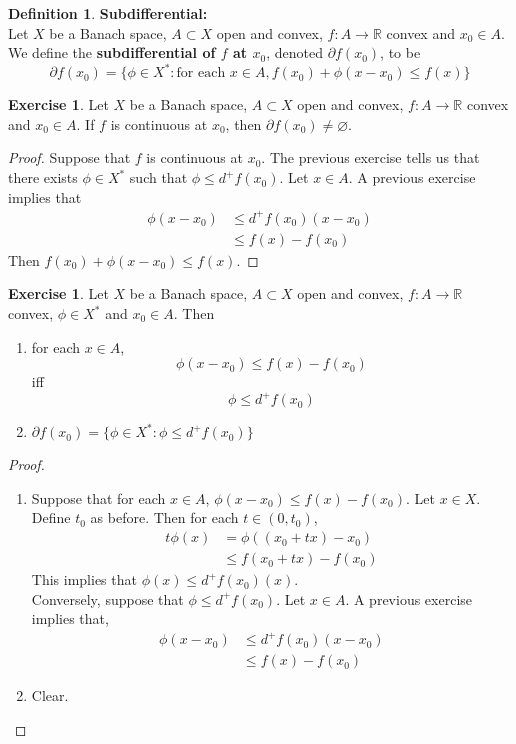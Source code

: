 \documentclass[12pt]{amsart}
\theoremstyle{definition}
\newtheorem{defn}[definition]{Definition}
\newtheorem{ex}[definition]{Exercise}
\newcommand{\R}{\mathbb{R}}
\newcommand{\p}{\partial}
\newcommand{\lex}[1]{\label{ex:#1}}
\newcommand{\ld}[1]{\label{defn:#1}}
\begin{document}
	\begin{defn} \ld{}\textbf{Subdifferential:}\\
	Let $X$ be a Banach space, $A \subset X$ open and convex, $f:A \rightarrow \R$ convex and $x_0 \in A$. We define the \textbf{subdifferential of $f$ at $x_0$}, denoted $\p f(x_0)$, to be $$\p f(x_0) = \{ \phi \in X^*: \text{for each } x \in A, f(x_0) + \phi(x-x_0) \leq f(x)\}$$
	\end{defn}
	
	\begin{ex} \lex{}
	Let $X$ be a Banach space, $A \subset X$ open and convex, $f:A \rightarrow \R$ convex and $x_0 \in A$. If $f$ is continuous at $x_0$, then $\p f(x_0) \neq \varnothing$.
	\end{ex}
	
	\begin{proof}
	Suppose that $f$ is continuous at $x_0$. The previous exercise tells us that there exists $\phi \in X^*$ such that $\phi \leq d^+f(x_0)$. Let $x \in A$. A previous exercise implies that
	\begin{align*}
	\phi(x-x_0) 
	& \leq d^+f(x_0)(x - x_0) \\
	& \leq f(x) - f(x_0)
	\end{align*}
	Then $f(x_0) + \phi(x-x_0) \leq f(x)$.
	\end{proof}
	
	\begin{ex} \lex{}
	Let $X$ be a Banach space, $A \subset X$ open and convex, $f:A \rightarrow \R$ convex, $\phi \in X^*$ and $x_0 \in A$. Then 
	\begin{enumerate}
	\item for each $x \in A$, $$\phi(x-x_0) \leq f(x) - f(x_0)$$ iff  $$\phi \leq d^+f(x_0)$$ 
	\item  $\p f(x_0) = \{ \phi \in X^*: \phi \leq d^+ f(x_0)\}$
	\end{enumerate}
	\end{ex}	
	
	\begin{proof}\
	\begin{enumerate}
	\item Suppose that for each $x \in A$, $\phi(x-x_0) \leq f(x) - f(x_0)$. Let $x \in X$. Define $t_0$ as before. Then for each $t \in (0, t_0)$, 
	\begin{align*}
	t\phi(x)
	&= \phi((x_0 + tx) - x_0) \\
	& \leq f(x_0 + tx) - f(x_0)
	\end{align*}	 
	This implies that $\phi(x) \leq d^+f(x_0)(x)$.\\
	Conversely, suppose that $\phi \leq d^+f(x_0)$. Let $x \in A$. A previous exercise implies that, 
	\begin{align*}
	\phi(x-x_0) 
	& \leq d^+f(x_0)(x-x_0) \\
	&\leq f(x) - f(x_0)
	\end{align*}
	\item Clear.
	\end{enumerate}
	\end{proof}
	
\end{document}
